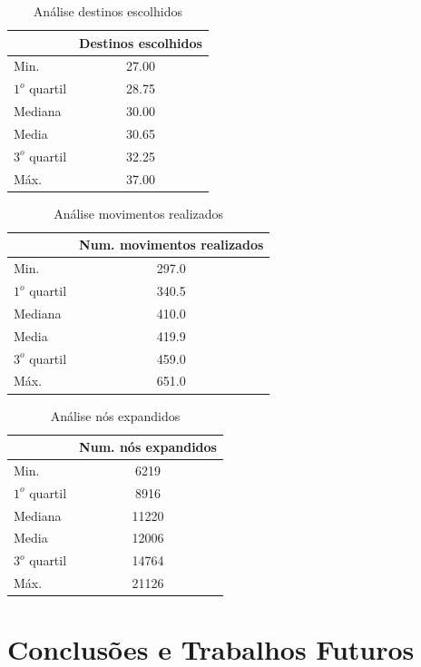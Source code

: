 \documentclass[12pt]{article}
\begin{document}
\begin{table}[h]
	\centering
	\begin{tabular}{|l|c|}
	\hline
	& Destinos escolhidos \\ \hline
	Min. & 27.00 \\ \hline
	$1^{o}$ quartil & 28.75 \\ \hline
	Mediana & 30.00 \\ \hline
	Media & 30.65 \\ \hline
	$3^{o}$ quartil & 32.25 \\ \hline
	Máx. & 37.00 \\ \hline
	\end{tabular}
	\caption{Análise destinos escolhidos}
	\label{tabela:destinos}
\end{table}


\begin{table}[h]
	\centering
	\begin{tabular}{|l|c|}
	\hline
	& Num. movimentos realizados \\ \hline
	Min. & 297.0 \\ \hline
	$1^{o}$ quartil & 340.5 \\ \hline
	Mediana & 410.0 \\ \hline
	Media & 419.9 \\ \hline
	$3^{o}$ quartil & 459.0 \\ \hline
	Máx. & 651.0 \\ \hline
	\end{tabular}
	\caption{Análise movimentos realizados}
	\label{tabela:movimentos}
\end{table}


\begin{table}[h]
	\centering
	\begin{tabular}{|l|c|}
	\hline
	& Num. nós expandidos \\ \hline
	Min. & 6219 \\ \hline
	$1^{o}$ quartil & 8916 \\ \hline
	Mediana & 11220 \\ \hline
	Media & 12006 \\ \hline
	$3^{o}$ quartil & 14764 \\ \hline
	Máx. & 21126 \\ \hline
	\end{tabular}
	\caption{Análise nós expandidos}
	\label{tabela:nosExpandidos}
\end{table}
\section{Conclusões e Trabalhos Futuros} \label{sec:Conclusoes}



\end{document}
